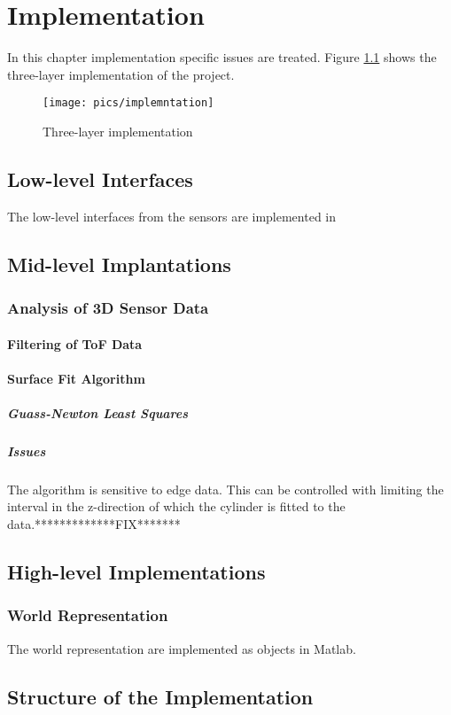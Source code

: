 
\chapter{Implementation}
In this chapter implementation specific issues are treated. Figure
\ref{chap6:fig-implementation} shows the three-layer implementation of the project.
\begin{figure}[htbp]
    \centering
    \texttt{[image: pics/implemntation]}
    \caption{Three-layer implementation}
    \label{chap6:fig-implementation}
\end{figure}


\section{Low-level Interfaces}
The low-level interfaces from the sensors are implemented in 


\section{Mid-level Implantations}

\subsection{Analysis of 3D Sensor Data}

\subsubsection{Filtering of ToF Data}


\subsubsection{Surface Fit Algorithm}


\paragraph{Guass-Newton Least Squares}


\paragraph{Issues}
The algorithm is sensitive to edge data. This can be controlled with limiting the interval
in the z-direction of which the cylinder is fitted to the data.*************FIX*******


\section{High-level Implementations}

\subsection{World Representation}
The world representation are implemented as objects in Matlab.



\section{Structure of the Implementation}


